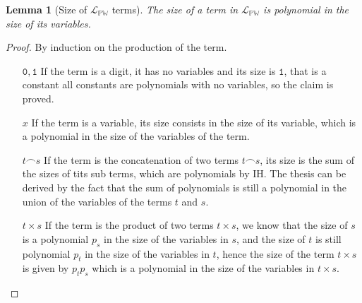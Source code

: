 \documentclass[10pt]{amsart}
\newcommand{\Wl}{\mathbb{PW}}
\newcommand{\POR}{\mathcal{POR}}
\newcommand{\conc}{\frown}
\newcommand{\zero}{\mathtt{0}}
\newcommand{\one}{\mathtt{1}}
\newcommand{\vone}{x}
\newcommand{\vtwo}{y}
\newcommand{\oone}{\omega}
\newcommand{\cost}{\mathcal C}
\newtheorem{defn}{Definition}
\newtheorem{lemma}{Lemma}
\begin{document}
\begin{comment}
\begin{defn}[Cost model for $\POR$]
We assign the following computational cost to each $f \in \POR$, according to the function $\cost$:
\begin{align*}
\cost(E(\vone, \oone)) &\coloneqq \lambda \vone.1\\
\cost(C_0(\vone, \oone)) &\coloneqq \lambda \vone. 1\\
\cost(C_1(\vone, \oone)) &\coloneqq \lambda \vone. 1\\
\cost(P_i^n(\vone_1, \ldots, \vone_n, \oone)) &\coloneqq \lambda \vone_1, \ldots, \vone_n. \sum_{j=1}^n |\vone_i|\\
\cost(Q(\vone, \vtwo, \oone)) &\coloneqq \lambda \vone, \vtwo. |\vone|+|\vtwo|\\
\cost(g(h_1(\vone_1, \ldots,\vone_n), \ldots, h_k(\vone_1, \ldots,\vone_n))) &\coloneqq \lambda \vone_1, \ldots, \vone_n. \sum_{j=0}^k\cost(h_j)(\vone_1, \ldots, \vone_n)+ \\&\qquad\cost(g)(h_1(x_0, \ldots, x_n), \ldots, h_k(x_0, \ldots, x_n))\\
\cost(f) &\coloneqq \lambda \vone_1, \ldots, \vone_n. \cost(g)(\vone_1, \ldots, \vone_n)+ \sum_{j=0}^k
\end{align*}
\end{defn}
\end{comment}

\begin{lemma}[Size of $\mathcal L_\Wl$ terms]
\label{lemma:sizeofterms}
The size of a term in $\mathcal L_\Wl$ is polynomial in the size of its variables.
\end{lemma}
\begin{proof}
By induction on the production of the term.
\begin{itemize}
\item[$\zero,\one$] If the term is a digit, it has no variables and its size is $\one$, that is a constant all constants are polynomials with no variables, so the claim is proved.
\item[$\vone$] If the term is a variable, its size consists in the size of its variable, which is a polynomial in the size of the variables of the term.
\item[$t \conc s$] If the term is the concatenation of two terms $t \conc s$, its size is the sum of the sizes of tits sub terms, which are polynomials by IH. The thesis can be derived by the fact that the sum of polynomials is still a polynomial in the union of the variables of the terms $t$ and $s$.
\item[$t \times s$] If the term is the product of two terms $t \times s$, we know that the size of $s$ is a polynomial $p_s$ in the size of the variables in $s$, and the size of $t$ is still polynomial $p_t$ in the size of the variables in $t$, hence the size of the term $t\times s$ is given by $p_tp_s$ which is a polynomial in the size of the variables in $t\times s$.
\end{itemize}
\end{proof}
\end{document}
